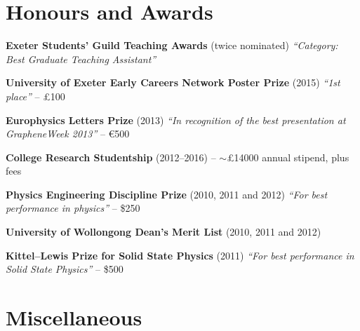 \documentclass[11pt,a4paper,sans]{moderncv}        %
\begin{document}
\section{Honours and Awards}
\vspace{5pt}
\begin{itemize}\small{
\item{\textbf{Exeter Students’ Guild Teaching Awards} \small{(twice nominated) \textit{``Category: Best Graduate Teaching Assistant''}}}
\item{\textbf{University of Exeter Early Careers Network Poster Prize} \small{(2015) \textit{``1st place''}} -- £100}
\item{\textbf{Europhysics Letters Prize} \small{(2013) \textit{``In recognition of the best presentation at GrapheneWeek 2013''}} -- \euro 500}
\item{\textbf{College Research Studentship}\small{ (2012--2016)} -- $\sim$£14000 annual stipend, plus fees}
\item{\textbf{Physics Engineering Discipline Prize} \small{(2010, 2011 and 2012) \textit{``For best performance in physics''}} -- \$250}
\item{\textbf{University of Wollongong Dean's Merit List}\small{ (2010, 2011 and 2012)}}
\item{\textbf{Kittel--Lewis Prize for Solid State Physics}\small{ (2011) \textit{``For best performance in Solid State Physics''}} -- \$500}}
\end{itemize}

\section{Miscellaneous}

\vspace{5pt}
\end{document}
